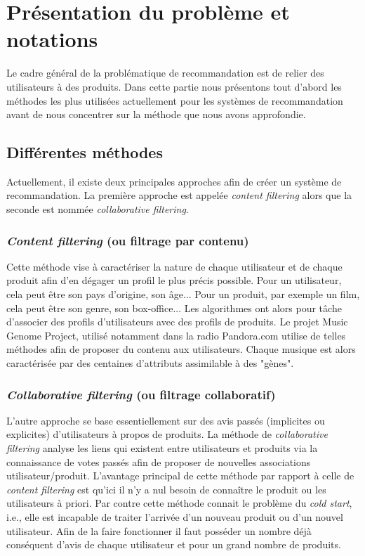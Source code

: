 \documentclass[10pt,a4paper]{article}
\begin{document}
\section{Présentation du problème et notations}

Le cadre général de la problématique de recommandation est de relier des utilisateurs à des produits. Dans cette partie nous présentons tout d'abord les méthodes les plus utilisées actuellement pour les systèmes de recommandation avant de nous concentrer sur la méthode que nous avons approfondie.

\subsection{Différentes méthodes}

Actuellement, il existe deux principales approches afin de  créer un système de recommandation. La première approche est appelée \textit{content filtering} alors que la seconde est nommée \textit{collaborative filtering}.

\subsubsection*{\textit{Content filtering} (ou filtrage par contenu)}

Cette méthode vise à caractériser la nature de chaque utilisateur et de chaque produit afin d'en dégager un profil le plus précis possible. Pour un utilisateur, cela peut être son pays d'origine, son âge... Pour un produit, par exemple un film, cela peut être son genre, son box-office... Les algorithmes ont alors pour tâche d'associer des profils d'utilisateurs avec des profils de produits. Le projet Music Genome Project, utilisé notamment dans la radio Pandora.com utilise de telles méthodes afin de proposer du contenu aux utilisateurs. Chaque musique est alors caractérisée par des centaines d'attributs assimilable à des "gènes". 


\subsubsection*{\textit{Collaborative filtering} (ou filtrage collaboratif)}

L'autre approche se base essentiellement sur des avis passés (implicites ou explicites) d'utilisateurs à propos de produits. La méthode de \textit{collaborative filtering} analyse les liens qui existent entre utilisateurs et produits via la connaissance de votes passés afin de proposer de nouvelles associations utilisateur/produit. L'avantage principal de cette méthode par rapport à celle de \textit{content filtering} est qu'ici il n'y a nul besoin de connaître le produit ou les utilisateurs à priori. Par contre cette méthode connait le problème du \textit{cold start}, i.e., elle est incapable de traiter l'arrivée d'un nouveau produit ou d'un nouvel utilisateur. Afin de la faire fonctionner il faut posséder un nombre déjà conséquent d'avis de chaque utilisateur et pour un grand nombre de produits.
\end{document}
